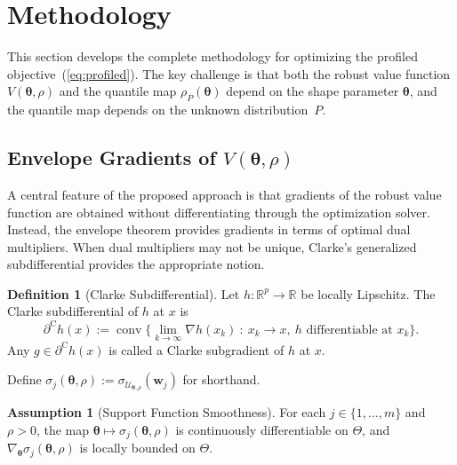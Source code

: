 \documentclass[lettersize,journal]{IEEEtran}
\newcommand{\R}{\mathbb{R}}
\newcommand{\cU}{\mathcal{U}}
\newcommand{\btheta}{\bm{\theta}}
\newcommand{\bw}{\bm{w}}
\DeclareMathOperator{\conv}{conv}
\newcommand{\clsubd}{\partial^{\mathrm{C}}} %
\theoremstyle{definition}
\newtheorem{definition}{Definition}
\newtheorem{assumption}{Assumption}
\begin{document}
\section{Methodology}
\label{sec:methodology}

This section develops the complete methodology for optimizing the profiled objective~(\ref{eq:profiled}). The key challenge is that both the robust value function $V(\btheta,\rho)$ and the quantile map $\rho_P(\btheta)$ depend on the shape parameter $\btheta$, and the quantile map depends on the unknown distribution~$P$.

\subsection{Envelope Gradients of $V(\btheta,\rho)$}

A central feature of the proposed approach is that gradients of the robust value function are obtained without differentiating through the optimization solver. Instead, the envelope theorem provides gradients in terms of optimal dual multipliers. When dual multipliers may not be unique, Clarke's generalized subdifferential provides the appropriate notion.

\begin{definition}[Clarke Subdifferential]\label{def:clarke}
Let $h:\R^p\to\R$ be locally Lipschitz. The Clarke subdifferential of $h$ at $x$ is
\[
\clsubd h(x)
:=\conv\Big\{\lim_{k\to\infty}\nabla h(x_k)\ :\ x_k\to x,\ h \text{ differentiable at }x_k\Big\}.
\]
Any $g\in\clsubd h(x)$ is called a Clarke subgradient of $h$ at $x$.
\end{definition}

Define $\sigma_j(\btheta,\rho) := \sigma_{\cU_{\btheta,\rho}}(\bw_j)$ for shorthand.

\begin{assumption}[Support Function Smoothness]\label{asm:sigma-diff}
For each $j \in \{1,\ldots,m\}$ and $\rho > 0$, the map $\btheta \mapsto \sigma_j(\btheta,\rho)$ is continuously differentiable on $\Theta$, and $\nabla_{\btheta}\sigma_j(\btheta,\rho)$ is locally bounded on $\Theta$.
\end{assumption}
\end{document}
